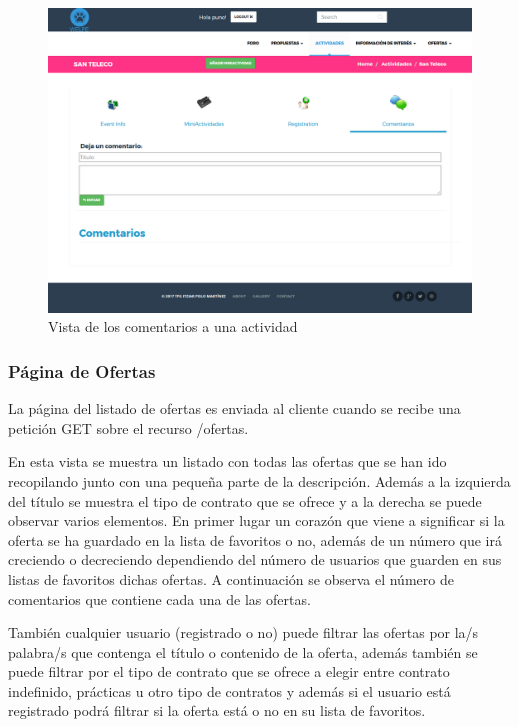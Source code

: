 \begin{figure}[H]
   \centering
   \includegraphics[width=12cm]{img/actividad_comment}
   \caption{Vista de los comentarios a una actividad}
   \label{figura:actividad_comment}
\end{figure}


\subsubsection{Página de Ofertas}
\label{subsubsec:ofertas}


La página del listado de ofertas es enviada al cliente cuando se recibe una petición GET sobre el recurso /ofertas.


En esta vista se muestra un listado con todas las ofertas que se han ido recopilando junto con una pequeña parte de la descripción. Además a la izquierda del título se muestra el tipo de contrato que se ofrece y a la derecha se puede observar varios elementos. En primer lugar un corazón que viene a significar si la oferta se ha guardado en la lista de favoritos o no, además de un número que irá creciendo o decreciendo dependiendo del número de usuarios que guarden en sus listas de favoritos dichas ofertas. A continuación se observa el número de comentarios que contiene cada una de las ofertas.


También cualquier usuario (registrado o no) puede filtrar las ofertas por la/s palabra/s que contenga el título o contenido de la oferta, además también se puede filtrar por el tipo de contrato que se ofrece a elegir entre contrato indefinido, prácticas u otro tipo de contratos y además si el usuario está registrado podrá filtrar si la oferta está o no en su lista de favoritos.


